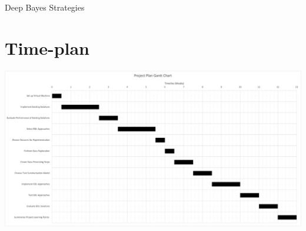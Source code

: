 \documentclass[ %
                    author={James Stephenson},
                supervisor={Dr. Edwin Simpson},
                    degree={MSc},
                     title={Project Plan: Bayesian Deep Learning For Extractive Test Summarisation},
                  subtitle={},
                      type={},
                      year={2022}]{../additions/dissertation}
\begin{document}
			Deep Bayes Strategies

		
	
	
	
	\backmatter
	
	
	
	
	
	\appendix
	
	\chapter{Time-plan}
		\label{appx:timeplan}
		
		\begin{center}
			\includegraphics[width=\textwidth,height=\textheight,keepaspectratio]{Gantt.png}
		\end{center}
		
\end{document}
